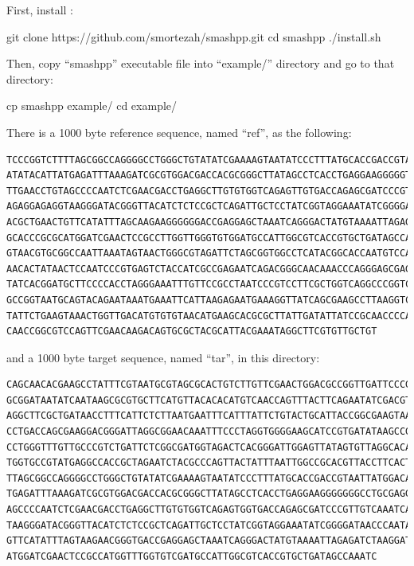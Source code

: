 \documentclass[a4paper,9pt]{extarticle}
\newcommand*{\method}[1]{\text{#1}\xspace}
\newcommand*{\smashpp}   {\method{Smash++}}
\begin{document}
First, install \smashpp:
\begin{code}[style=bash]
git clone https://github.com/smortezah/smashpp.git
cd smashpp
./install.sh
\end{code}
Then, copy ``smashpp'' executable file into ``example/'' directory and go to that directory:
\begin{code}[style=bash]
cp smashpp example/
cd example/
\end{code}
There is a 1000 byte reference sequence, named ``ref'', as the following:
\begin{verbatim}
TCCCGGTCTTTTAGCGGCCAGGGGCCTGGGCTGTATATCGAAAAGTAATATCCCTTTATGCACCGACCGTAATTATGGACAGCAC
ATATACATTATGAGATTTAAAGATCGCGTGGACGACCACGCGGGCTTATAGCCTCACCTGAGGAAGGGGGTGCCTGCGAGGGAGC
TTGAACCTGTAGCCCCAATCTCGAACGACCTGAGGCTTGTGTGGTCAGAGTTGTGACCAGAGCGATCCCGTTGTCAAATCAACCT
AGAGGAGAGGTAAGGGATACGGGTTACATCTCTCCGCTCAGATTGCTCCTATCGGTAGGAAATATCGGGGATAACCCAATACAAA
ACGCTGAACTGTTCATATTTAGCAAGAAGGGGGGACCGAGGAGCTAAATCAGGGACTATGTAAAATTAGAGTTCTAAGGATAGTA
GCACCCGCGCATGGATCGAACTCCGCCTTGGTTGGGTGTGGATGCCATTGGCGTCACCGTGCTGATAGCCAAATCCCTAGTGAAG
GTAACGTGCGGCCAATTAAATAGTAACTGGGCGTAGATTCTAGCGGTGGCCTCATACGGCACCAATGTCCATCCTCCCTGTGCCT
AACACTATAACTCCAATCCCGTGAGTCTACCATCGCCGAGAATCAGACGGGCAACAAACCCAGGGAGCGAGAGCTACGCGGCTTA
TATCACGGATGCTTCCCCACCTAGGGAAATTTGTTCCGCCTAATCCCGTCCTTCGCTGGTCAGGCCCGGTCTAGCGGATTACTTC
GCCGGTAATGCAGTACAGAATAAATGAAATTCATTAAGAGAATGAAAGGTTATCAGCGAAGCCTTAAGGTCCAACAAGACGTCGA
TATTCTGAAGTAAACTGGTTGACATGTGTGTAACATGAAGCACGCGCTTATTGATATTATCCGCAACCCCACGGCTGGCGGGAAT
CAACCGGCGTCCAGTTCGAACAAGACAGTGCGCTACGCATTACGAAATAGGCTTCGTGTTGCTGT
\end{verbatim}
and a 1000 byte target sequence, named ``tar'', in this directory:
\begin{verbatim}
CAGCAACACGAAGCCTATTTCGTAATGCGTAGCGCACTGTCTTGTTCGAACTGGACGCCGGTTGATTCCCGCCAGCCGTGGGGTT
GCGGATAATATCAATAAGCGCGTGCTTCATGTTACACACATGTCAACCAGTTTACTTCAGAATATCGACGTCTTGTTGGACCTTA
AGGCTTCGCTGATAACCTTTCATTCTCTTAATGAATTTCATTTATTCTGTACTGCATTACCGGCGAAGTAATCCGCTAGACCGGG
CCTGACCAGCGAAGGACGGGATTAGGCGGAACAAATTTCCCTAGGTGGGGAAGCATCCGTGATATAAGCCGCGTAGCTCTCGCTC
CCTGGGTTTGTTGCCCGTCTGATTCTCGGCGATGGTAGACTCACGGGATTGGAGTTATAGTGTTAGGCACAGGGAGGATGGACAT
TGGTGCCGTATGAGGCCACCGCTAGAATCTACGCCCAGTTACTATTTAATTGGCCGCACGTTACCTTCACTAGGATCCCGGTCTT
TTAGCGGCCAGGGGCCTGGGCTGTATATCGAAAAGTAATATCCCTTTATGCACCGACCGTAATTATGGACAGCACATATACATTA
TGAGATTTAAAGATCGCGTGGACGACCACGCGGGCTTATAGCCTCACCTGAGGAAGGGGGGGCCTGCGAGGGAGCTTGAACCTGT
AGCCCCAATCTCGAACGACCTGAGGCTTGTGTGGTCAGAGTGGTGACCAGAGCGATCCCGTTGTCAAATCAACCTAGAGGAGAGG
TAAGGGATACGGGTTACATCTCTCCGCTCAGATTGCTCCTATCGGTAGGAAATATCGGGGATAACCCAATACAAAACGCTGAACT
GTTCATATTTAGTAAGAACGGGTGACCGAGGAGCTAAATCAGGGACTATGTAAAATTAGAGATCTAAGGATAGTAGCACCCGCGC
ATGGATCGAACTCCGCCATGGTTTGGTGTCGATGCCATTGGCGTCACCGTGCTGATAGCCAAATC
\end{verbatim}
\end{document}
